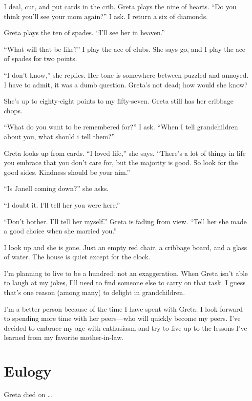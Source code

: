 \documentclass[
  letterpaper,
  DIV=11,
  numbers=noendperiod]{scrreprt}
\begin{document}
I deal, cut, and put cards in the crib. Greta plays the nine of hearts.
``Do you think you'll see your mom again?'' I ask. I return a six of
diamonds.

Greta plays the ten of spades. ``I'll see her in heaven.''

``What will that be like?'' I play the ace of clubs. She says go, and I
play the ace of spades for two points.

``I don't know,'' she replies. Her tone is somewhere between puzzled and
annoyed. I have to admit, it was a dumb question. Greta's not dead; how
would she know?

She's up to eighty-eight points to my fifty-seven. Greta still has her
cribbage chops.

``What do you want to be remembered for?'' I ask. ``When I tell
grandchildren about you, what should i tell them?''

Greta looks up from cards. ``I loved life,'' she says. ``There's a lot
of things in life you embrace that you don't care for, but the majority
is good. So look for the good sides. Kindness should be your aim.''

``Is Janell coming down?'' she asks.

``I doubt it. I'll tell her you were here.''

``Don't bother. I'll tell her myself.'' Greta is fading from view.
``Tell her she made a good choice when she married you.''

I look up and she is gone. Just an empty red chair, a cribbage board,
and a glass of water. The house is quiet except for the clock.

I'm planning to live to be a hundred: not an exaggeration. When Greta
isn't able to laugh at my jokes, I'll need to find someone else to carry
on that task. I guess that's one reason (among many) to delight in
grandchildren.

I'm a better person because of the time I have spent with Greta. I look
forward to spending more time with her peers---who will quickly become
my peers. I've decided to embrace my age with enthusiasm and try to live
up to the lessons I've learned from my favorite mother-in-law.


\chapter{Eulogy}\label{eulogy}

Greta died on \ldots{}
\end{document}
